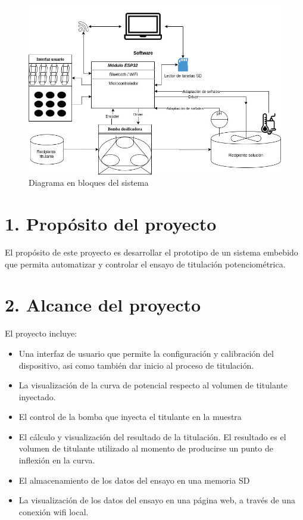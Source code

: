\documentclass[11pt]{charter}
\begin{document}
\begin{figure}[htpb]
\centering 
\includegraphics[width=1\textwidth]{./Figuras/diagBloques.jpg}
\caption{Diagrama en bloques del sistema}
\label{fig:diagBloques}
\end{figure}

\section{1. Propósito del proyecto}
\label{sec:proposito}


El propósito de este proyecto es desarrollar el prototipo de un sistema embebido que permita automatizar y controlar el ensayo de titulación potenciométrica.


\section{2. Alcance del proyecto}
\label{sec:alcance}

El proyecto incluye:
\begin{itemize}
\item Una interfaz de usuario que permite la configuración y calibración del dispositivo, asi como también dar inicio al proceso de titulación.
\item La visualización de la curva de potencial respecto al volumen de titulante inyectado.
\item El control de la bomba que inyecta el titulante en la muestra
\item El cálculo y visualización del resultado de la titulación. El resultado es el volumen de titulante utilizado al momento de producirse un punto de inflexión en la curva.
\item El almacenamiento de los datos del ensayo en una memoria SD
\item La visualización de los datos del ensayo en una página web, a través de una conexión wifi local.
\end{itemize}
\end{document}
